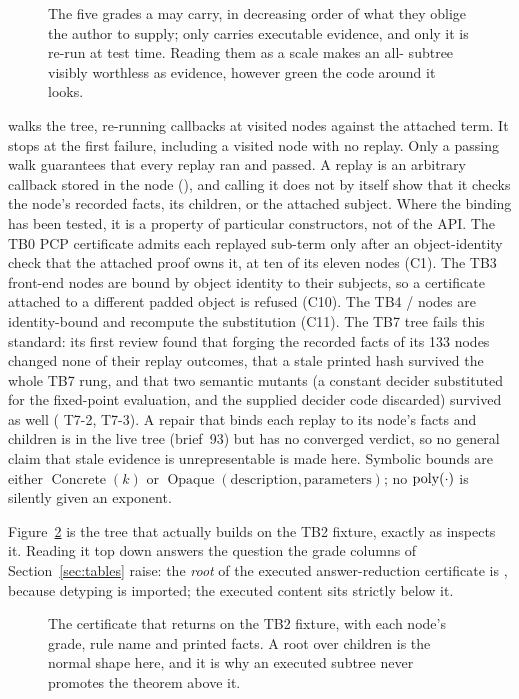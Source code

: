 \begin{figure}[H]
\centering

\caption{The five grades a  may carry, in decreasing order of what they oblige the author to supply; only  carries executable evidence, and only it is re-run at test time.  Reading them as a scale makes an all- subtree visibly worthless as evidence, however green the code around it looks.}
\label{fig:grades}
\end{figure}

 walks the tree, re-running 
callbacks at visited nodes against the attached term.  It stops at the first
failure, including a visited  node with no replay.  Only a
passing walk guarantees that every  replay ran and passed.
A replay is an arbitrary
callback stored in the node (), and calling it does
not by itself show that it checks the node's recorded facts, its children, or
the attached subject.  Where the binding has been tested, it is a property of
particular constructors, not of the API.  The TB0 PCP certificate admits each
replayed sub-term only after an object-identity check that the attached proof
owns it, at ten of its eleven nodes (C1).  The TB3 front-end nodes are bound by object identity to their
subjects, so a certificate attached to a different padded object is refused
(C10).  The TB4 / nodes are
identity-bound and recompute the substitution (C11).  The TB7 tree fails this
standard: its first review found that forging the recorded facts of its 133
 nodes changed none of their replay outcomes, that a stale
printed hash survived the whole TB7 rung, and that two semantic mutants
(a constant decider substituted for the fixed-point evaluation, and the
supplied decider code discarded) survived as well ( T7-2, T7-3).  A repair that binds each
replay to its node's facts and children is in the live tree (brief~93) but has
no converged verdict, so no general claim that stale evidence is
unrepresentable is made here.  Symbolic bounds are either
\(\operatorname{Concrete}(k)\) or
\(\operatorname{Opaque}(\text{description},\text{parameters})\); no
\(\operatorname{poly}(\cdot)\) is silently given an exponent.

Figure~\ref{fig:certificate-tree} is the tree that
 actually builds on the TB2 fixture, exactly as
 inspects it.  Reading it top down answers the
question the grade columns of Section~\ref{sec:tables} raise: the
\emph{root} of the executed answer-reduction certificate is ,
because detyping is imported; the executed content sits strictly below it.
\begin{figure}[H]
\centering

\caption{The certificate that  returns on the TB2 fixture, with each node's grade, rule name and printed facts.  A  root over  children is the normal shape here, and it is why an executed subtree never promotes the theorem above it.}
\label{fig:certificate-tree}
\end{figure}

